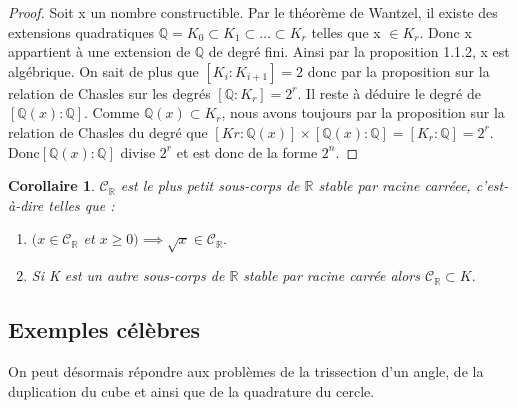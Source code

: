 \documentclass[a4paper,12pt,french,draft]{report}
\newtheorem{corollaire}{Corollaire}[section]
\begin{document}
		     \begin{proof}
		     Soit x un nombre constructible. Par le théorème de Wantzel, il 
		     existe des extensions quadratiques \( \mathbb{Q} = K_{0} 
		     \subset K_{1} \subset \dots \subset K_{r} \) telles que x 
		     \( \in K_{r} \). Donc x appartient à une extension de \( 
		     \mathbb{Q} \) de degré fini. Ainsi par la proposition 
		     1.1.2, x est algébrique. On sait de plus que \( 
		     [K_{i}:K_{i+1}] = 2 \) donc par la proposition sur 
		     la relation de Chasles sur les degrés \( 
		     [\mathbb{Q}:K_{r}] 
		     = 2^{r} \). Il reste à déduire le degré de \( 
		     [\mathbb{Q}(x):\mathbb{Q}] \). Comme \( \mathbb{Q}(x) \subset K_{r} 
		     \), nous avons toujours par la proposition sur la relation 
		     de Chasles du degré que \( [K{r}:\mathbb{Q}(x)]\times 
		     [\mathbb{Q}(x):\mathbb{Q}] = [K_{r}:\mathbb{Q}] = 2^{r}. 
		     \)Donc\( [\mathbb{Q}(x):\mathbb{Q}] \) divise \(2^{r}\) et est donc 
		     de la forme \(2^{n}\).
		     \end{proof} 
		     
		     \begin{corollaire}
		     
		     \(\mathscr{C}_{\mathbb{R}} \) est le plus petit sous-corps 
		     de \(\mathbb{R}\) stable par racine carréee, c'est-à-dire 
		     telles que :
		     \begin{enumerate}
		      \item \( (x \in \mathscr{C}_{\mathbb{R}}\) et \(x \geq 0) 
		      \implies \sqrt{x} \in \mathscr{C}_{\mathbb{R}}.\)
		      \item Si K est un autre sous-corps de \(\mathbb{R}\) 
		      stable par racine carrée alors \(\mathscr{C}_{\mathbb{R}} 
		      \subset K.\)
		      
		     \end{enumerate}
		     
		     \end{corollaire}
		
		
		\subsection{Exemples célèbres}
		
        On peut désormais répondre aux problèmes de la trissection 
        d'un angle, de la duplication du cube et ainsi que de la 
        quadrature du cercle.
        
\end{document}
